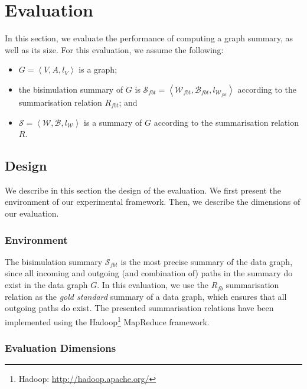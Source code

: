 \section{Evaluation}
\label{sec:summary:eval}

In this section, we evaluate the performance of computing a graph summary, as well as its size.
For this evaluation, we assume the following:
\begin{itemize}
	\item $G=\left\langle V, A, l_V \right\rangle$ is a graph;
	\item the bisimulation summary of $G$ is $\mathcal{S}_{fbt} = \left\langle \mathcal{W}_{fbt}, \mathcal{B}_{fbt}, l_{\mathcal{W}_{fbt}} \right\rangle$ according to the summarisation relation $R_{fbt}$; and
	\item $\mathcal{S} = \left\langle \mathcal{W}, \mathcal{B}, l_{\mathcal{W}} \right\rangle$ is a summary of $G$ according to the summarisation relation $R$.
\end{itemize}

\subsection{Design}
\label{sec:eval:design}

We describe in this section the design of the evaluation. We first present the environment of our experimental framework. Then, we describe the dimensions of our evaluation.

\subsubsection{Environment}

The bisimulation summary $\mathcal{S}_{fbt}$ is the most precise summary of the data graph, since all incoming and outgoing (and combination of) paths in the summary do exist in the data graph $G$. In this evaluation, we use the $R_{fb}$ summarisation relation as the \emph{gold standard} summary of a data graph, which ensures that all outgoing paths do exist. The presented summarisation relations have been implemented using the Hadoop\footnote{Hadoop: \url{http://hadoop.apache.org/}} MapReduce framework.

\subsubsection{Evaluation Dimensions}

